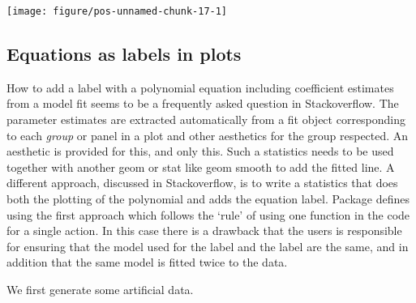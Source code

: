 \documentclass[paper=a4,10pt,div=17,headsepline,BCOR=12mm,twoside,open=right]{scrbook}\usepackage{knitr}
\begin{document}
\begin{knitrout}\footnotesize
{}\color{fgcolor}\begin{kframe}
\begin{alltt}
  \hlopt{+}
  \hlstd{(} \hlstd{=} \hlstd{)} \hlopt{+} \hlstd{(} \hlstd{=} \hlstd{)}
\end{alltt}
\end{kframe}

{\centering \texttt{[image: figure/pos-unnamed-chunk-17-1]} 

}



\end{knitrout}

\subsection{Equations as labels in plots}

How to add a label with a polynomial equation including coefficient estimates from a model fit seems to be a frequently asked question in Stackoverflow. The parameter estimates are extracted automatically from a fit object corresponding to each \textit{group} or panel in a plot and other aesthetics for the group respected. An aesthetic is provided for this, and only this. Such a statistics needs to be used together with another geom or stat like geom smooth to add the fitted line. A different approach, discussed in Stackoverflow, is to write a statistics that does both the plotting of the polynomial and adds the equation label. Package \ggpmisc defines  using the first approach which follows the `rule' of using one function in the code for a single action. In this case there is a drawback that the users is responsible for ensuring that the model used for the label and the label are the same, and in addition that the same model is fitted twice to the data.

We first generate some artificial data.
\end{document}
